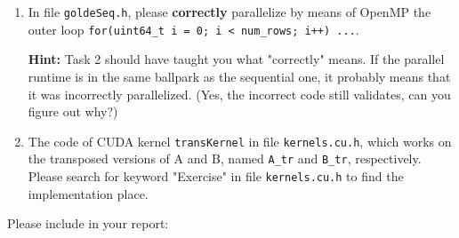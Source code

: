 \documentclass{article}
\begin{document}
\begin{enumerate}
    \item In file \texttt{goldeSeq.h}, please \textbf{correctly} parallelize by means of OpenMP the outer loop \texttt{for(uint64\_t i = 0; i < num\_rows; i++) ...}. 
    
    \textbf{Hint:} Task 2 should have taught you what "correctly" means. If the parallel runtime is in the same ballpark as the sequential one, it probably means that it was incorrectly parallelized. (Yes, the incorrect code still validates, can you figure out why?)
    
    \item The code of CUDA kernel \texttt{transKernel} in file \texttt{kernels.cu.h}, which works on the transposed versions of A and B, named \texttt{A\_tr} and \texttt{B\_tr}, respectively. Please search for keyword "Exercise" in file \texttt{kernels.cu.h} to find the implementation place.
\end{enumerate}

Please include in your report:
\end{document}
